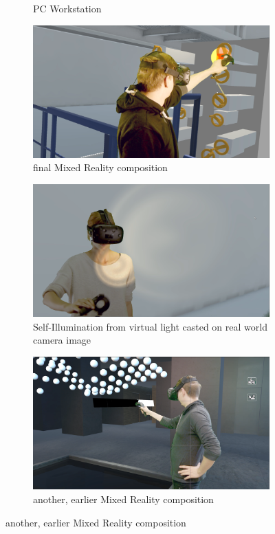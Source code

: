 \begin{figure}[htbp]
\begin{subfigure}[t]{.49\textwidth}
		\caption{PC Workstation}
	\end{subfigure}
	\hfill
	\begin{subfigure}[t]{.49\textwidth}
		\centering
		\includegraphics[width=\textwidth]{gfx/results/mr-action_new.png}
		\caption{final Mixed Reality composition}
	\end{subfigure}
	\begin{subfigure}[t]{.49\textwidth}
		\centering
		\includegraphics[width=\textwidth]{gfx/results/self-illu.png}
		\caption{Self-Illumination from virtual light casted on real world 
		camera image}
	\end{subfigure}
	\hfill
	\begin{subfigure}[t]{.49\textwidth}
		\centering
		\includegraphics[width=\textwidth]{gfx/results/mr-action_old.png}
		\caption{another, earlier Mixed Reality composition}
	\end{subfigure}
\end{figure}

